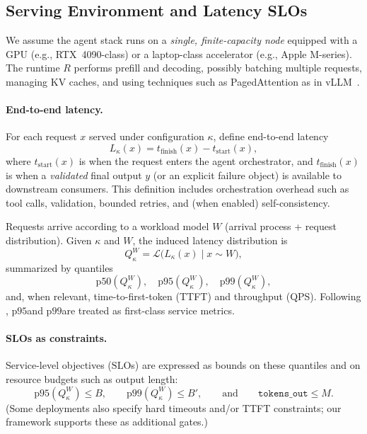 \documentclass[11pt]{article}
\newcommand{\pninetyfive}{\ensuremath{\mathrm{p95}}}
\newcommand{\pninetynine}{\ensuremath{\mathrm{p99}}}
\newcommand{\slo}{\ensuremath{\mathrm{SLO}}}
\begin{document}
\subsection{Serving Environment and Latency SLOs}
\label{sec:problem-slo}

We assume the agent stack runs on a \emph{single, finite-capacity node} equipped with a GPU (e.g., RTX~4090-class) or a laptop-class accelerator (e.g., Apple M-series).
The runtime $R$ performs prefill and decoding, possibly batching multiple requests, managing KV caches, and using techniques such as PagedAttention as in vLLM~\citep{kwon2023vllm}.

\paragraph{End-to-end latency.}
For each request $x$ served under configuration $\kappa$, define end-to-end latency
\[
L_\kappa(x) = t_{\text{finish}}(x) - t_{\text{start}}(x),
\]
where $t_{\text{start}}(x)$ is when the request enters the agent orchestrator, and $t_{\text{finish}}(x)$ is when a \emph{validated} final output $y$ (or an explicit failure object) is available to downstream consumers.
This definition includes orchestration overhead such as tool calls, validation, bounded retries, and (when enabled) self-consistency.

Requests arrive according to a workload model $W$ (arrival process + request distribution).
Given $\kappa$ and $W$, the induced latency distribution is
\[
Q_\kappa^W = \mathcal{L}\bigl(L_\kappa(x)\mid x\sim W\bigr),
\]
summarized by quantiles
\[
\mathrm{p50}(Q_\kappa^W),\quad \mathrm{p95}(Q_\kappa^W),\quad \mathrm{p99}(Q_\kappa^W),
\]
and, when relevant, time-to-first-token (TTFT) and throughput (QPS).
Following \citet{dean2013tail}, \pninetyfive and \pninetynine are treated as first-class service metrics.

\paragraph{SLOs as constraints.}
Service-level objectives (\slo s) are expressed as bounds on these quantiles and on resource budgets such as output length:
\[
\mathrm{p95}(Q_\kappa^W)\le B,\qquad \mathrm{p99}(Q_\kappa^W)\le B',\qquad \text{and}\qquad \texttt{tokens\_out}\le M.
\]
(Some deployments also specify hard timeouts and/or TTFT constraints; our framework supports these as additional gates.)
\end{document}
